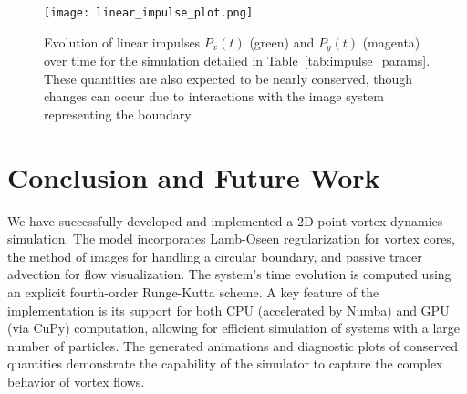 \documentclass[12pt,letterpaper]{article}
\begin{document}
\begin{figure}[H]
    \centering
    \texttt{[image: linear\_impulse\_plot.png]} 
    \caption{Evolution of linear impulses $P_x(t)$ (green) and $P_y(t)$ (magenta) over time for the simulation detailed in Table~\ref{tab:impulse_params}. These quantities are also expected to be nearly conserved, though changes can occur due to interactions with the image system representing the boundary.}
    \label{fig:linear_impulse_plot}
\end{figure}

\section{Conclusion and Future Work}
We have successfully developed and implemented a 2D point vortex dynamics simulation. The model incorporates Lamb-Oseen regularization for vortex cores, the method of images for handling a circular boundary, and passive tracer advection for flow visualization. The system's time evolution is computed using an explicit fourth-order Runge-Kutta scheme. A key feature of the implementation is its support for both CPU (accelerated by Numba) and GPU (via CuPy) computation, allowing for efficient simulation of systems with a large number of particles. The generated animations and diagnostic plots of conserved quantities demonstrate the capability of the simulator to capture the complex behavior of vortex flows.
\end{document}
